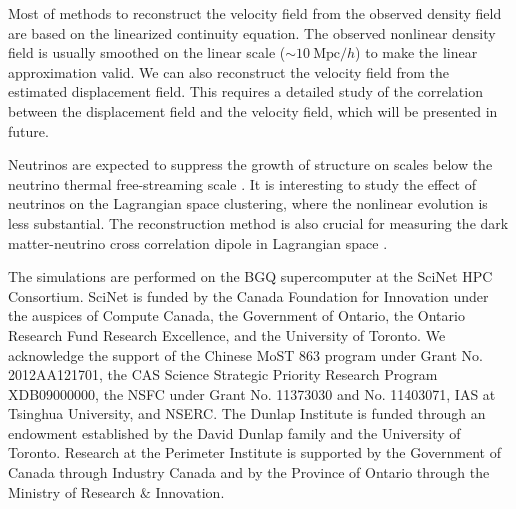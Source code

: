 \documentclass[aps,prl,twocolumn,showpacs,superscriptaddress,groupedaddress,nofootinbib]{revtex4}  %
\newcommand{\mr}{\mathrm}
\begin{document}
Most of methods to reconstruct the velocity field from the observed density 
field are based on the linearized continuity equation.
The observed nonlinear density field is usually smoothed on the linear scale
($\sim10\ \mr{Mpc}/h$) to make the linear approximation valid.
We can also reconstruct the velocity field from the estimated displacement 
field.
This requires a detailed study of the correlation between the displacement 
field and the velocity field, which will be presented in future.

Neutrinos are expected to suppress the growth of structure on scales below the 
neutrino thermal free-streaming scale \cite{1980bond}. 
It is interesting to study the effect of neutrinos on the Lagrangian space 
clustering, where the nonlinear evolution is less substantial. 
The reconstruction method is also crucial for measuring the dark matter-neutrino cross 
correlation dipole in Lagrangian space \cite{2014zhm,2016zhm}. 

The simulations are performed on the BGQ supercomputer at the SciNet HPC 
Consortium. SciNet is funded by the Canada Foundation for Innovation under 
the auspices of Compute Canada, the Government of Ontario, the Ontario Research 
Fund Research Excellence, and the University of Toronto.
We acknowledge the support of the Chinese MoST 863 program under Grant 
No. 2012AA121701, the CAS Science Strategic Priority Research Program 
XDB09000000, the NSFC under Grant No. 11373030 and No. 11403071, IAS at Tsinghua University, 
 and NSERC.
The Dunlap Institute is funded through an endowment established by the David Dunlap family and the University of Toronto.
Research at the Perimeter Institute is supported by the Government of Canada
through Industry Canada and by the Province of Ontario through the Ministry of
Research $\&$ Innovation.



\end{document}
